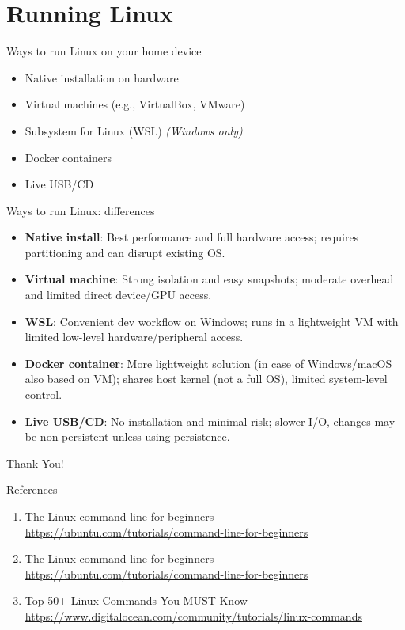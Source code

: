 \documentclass{beamer}
\begin{document}
\section{Running Linux}

\begin{frame}{Ways to run Linux on your home device}
  \begin{itemize}
    \item Native installation on hardware
    \item Virtual machines (e.g., VirtualBox, VMware)
    \item Subsystem for Linux (WSL) \textit{(Windows only)} 
    \item Docker containers
    \item Live USB/CD
  \end{itemize}
\end{frame}

\begin{frame}{Ways to run Linux: differences}
  \begin{itemize}
    \item \textbf{Native install}: Best performance and full hardware access; requires partitioning and can disrupt existing OS.\@
    \item \textbf{Virtual machine}: Strong isolation and easy snapshots; moderate overhead and limited direct device/GPU access.
    \item \textbf{WSL}: Convenient dev workflow on Windows; runs in a lightweight VM with limited low-level hardware/peripheral access.
    \item \textbf{Docker container}: More lightweight solution (in case of Windows/macOS also based on VM); shares host kernel (not a full OS), limited system-level control.
    \item \textbf{Live USB/CD}: No installation and minimal risk; slower I/O, changes may be non-persistent unless using persistence.
  \end{itemize}
\end{frame}

\begin{frame}
    \centering
    \Huge{Thank You!}
\end{frame}

\begin{frame}{References}
  \begin{enumerate}
    \item The Linux command line for beginners \href{https://ubuntu.com/tutorials/command-line-for-beginners}{https://ubuntu.com/tutorials/command-line-for-beginners}
    \item The Linux command line for beginners \href{https://ubuntu.com/tutorials/command-line-for-beginners}{https://ubuntu.com/tutorials/command-line-for-beginners}
    \item Top 50+ Linux Commands You MUST Know \href{https://www.digitalocean.com/community/tutorials/linux-commands}{https://www.digitalocean.com/community/tutorials/linux-commands}
  \end{enumerate}
\end{frame}
\end{document}
